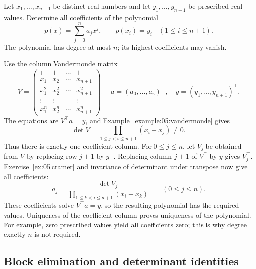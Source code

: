 \begin{problem}\label{ex:05:interpolation}
Let \(x_1,\ldots,x_{n+1}\) be distinct real numbers and let
\(y_1,\ldots,y_{n+1}\) be prescribed real values.
Determine all coefficients of the polynomial
\[
p(x)=\sum_{j=0}^n a_jx^j,\qquad p(x_i)=y_i\quad(1\leqslant i\leqslant n+1).
\]
The polynomial has degree at most \(n\); its highest coefficients may vanish.
\end{problem}
\begin{solution}
Use the column Vandermonde matrix
\[
V=\begin{pmatrix}
1&1&\cdots&1\\x_1&x_2&\cdots&x_{n+1}\\
x_1^2&x_2^2&\cdots&x_{n+1}^2\\
\vdots&\vdots&&\vdots\\x_1^n&x_2^n&\cdots&x_{n+1}^n
\end{pmatrix},\quad
a=(a_0,\ldots,a_n)^\top,\quad y=(y_1,\ldots,y_{n+1})^\top.
\]
The equations are \(V^\top a=y\), and Example~\ref{example:05:vandermonde} gives
\[
\det V=\prod_{1\leqslant j<i\leqslant n+1}(x_i-x_j)\ne0.
\]
Thus there is exactly one coefficient column.
For \(0\leqslant j\leqslant n\), let \(V_j\) be obtained from \(V\)
by replacing row \(j+1\) by \(y^\top\). Replacing column \(j+1\) of
\(V^\top\) by \(y\) gives \(V_j^\top\). Exercise~\ref{ex:05:cramer}
and invariance of determinant under transpose now give all coefficients:
\[
a_j=\frac{\det V_j}{\displaystyle\prod_{1\leqslant k<i\leqslant n+1}(x_i-x_k)}
\qquad(0\leqslant j\leqslant n).
\]
These coefficients solve \(V^\top a=y\), so the resulting polynomial has
the required values. Uniqueness of the coefficient column proves uniqueness
of the polynomial. For example, zero prescribed values yield all coefficients
zero; this is why degree exactly \(n\) is not required.
\end{solution}

\subsection*{Block elimination and determinant identities}

